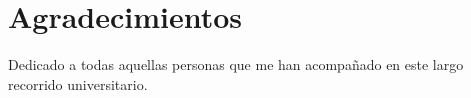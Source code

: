 \documentclass[12pt,twoside,titlepage]{report}
\newcommand{\nombreautor}{Jorge Contreras Padilla}
\newcommand{\nombretutor}{Francisco Gortázar Bellas\\Michel Maes Bermejo}
\newcommand{\titulotrabajo}{Estudio de sistemas de integración continua de proyectos GitHub y GitLab}
\newcommand{\escuelalargo}{Escuela Técnica Superior de Ingeniería Informática}
\newcommand{\universidad}{Universidad Rey Juan Carlos}
\newcommand{\fecha}{01/02/2022}
\newcommand\blankpage{%
    \newpage
    \null
    \thispagestyle{empty}%
    \newpage}
\begin{document}








\hypersetup{pageanchor=true}

\normalsize
\afterpage{\blankpage} %






\setlength{\parskip}{0.75em}
\renewcommand{\baselinestretch}{1.25}

\setcounter{page}{2}



\chapter*{Agradecimientos}

Dedicado a todas aquellas personas que me han acompañado en este largo recorrido universitario.
\end{document}
